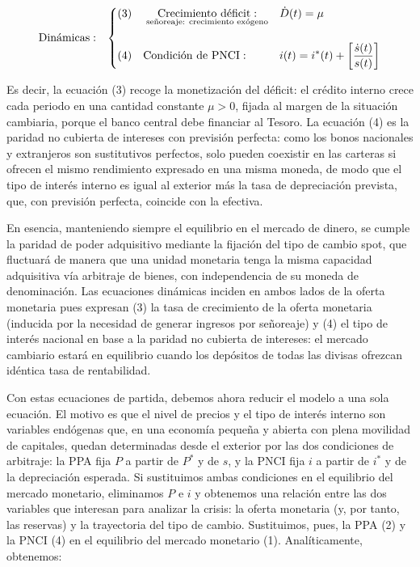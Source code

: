 \documentclass[10pt,a4paper]{article}
\begin{document}
$$\begin{aligned}
  \text{Dinámicas}:
    &&\left\{\begin{aligned}
        &(3)\quad\underset{\text{\scriptsize señoreaje: crecimiento exógeno}}{\text{Crecimiento déficit}:}&& \dot D(t)=\mu\\[1em]
        &(4)\quad\text{Condición de PNCI}: &&i(t)=i^*(t)+\left[\frac{\dot s(t)}{s(t)}\right]
    \end{aligned}\right.
\end{aligned}$$

Es decir, la ecuación (3) recoge la monetización del déficit: el crédito interno crece cada periodo en una cantidad constante $\mu>0$, fijada al margen de la situación cambiaria, porque el banco central debe financiar al Tesoro. La ecuación (4) es la paridad no cubierta de intereses con previsión perfecta: como los bonos nacionales y extranjeros son sustitutivos perfectos, solo pueden coexistir en las carteras si ofrecen el mismo rendimiento expresado en una misma moneda, de modo que el tipo de interés interno es igual al exterior más la tasa de depreciación prevista, que, con previsión perfecta, coincide con la efectiva.

En esencia, manteniendo siempre el equilibrio en el mercado de dinero, se cumple la paridad de poder adquisitivo mediante la fijación del tipo de cambio spot, que fluctuará de manera que una unidad monetaria tenga la misma capacidad adquisitiva vía arbitraje de bienes, con independencia de su moneda de denominación. Las ecuaciones dinámicas inciden en ambos lados de la oferta monetaria pues expresan (3) la tasa de crecimiento de la oferta monetaria (inducida por la necesidad de generar ingresos por señoreaje) y (4) el tipo de interés nacional en base a la paridad no cubierta de intereses: el mercado cambiario estará en equilibrio cuando los depósitos de todas las divisas ofrezcan idéntica tasa de rentabilidad.

Con estas ecuaciones de partida, debemos ahora reducir el modelo a una sola ecuación. El motivo es que el nivel de precios y el tipo de interés interno son variables endógenas que, en una economía pequeña y abierta con plena movilidad de capitales, quedan determinadas desde el exterior por las dos condiciones de arbitraje: la PPA fija $P$ a partir de $P^*$ y de $s$, y la PNCI fija $i$ a partir de $i^*$ y de la depreciación esperada. Si sustituimos ambas condiciones en el equilibrio del mercado monetario, eliminamos $P$ e $i$ y obtenemos una relación entre las dos variables que interesan para analizar la crisis: la oferta monetaria (y, por tanto, las reservas) y la trayectoria del tipo de cambio. Sustituimos, pues, la PPA (2) y la PNCI (4) en el equilibrio del mercado monetario (1). Analíticamente, obtenemos:
\end{document}
